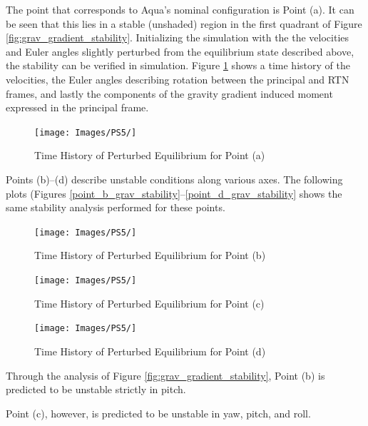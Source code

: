 The point that corresponds to Aqua's nominal configuration is Point (a). It can be seen that this lies in a stable (unshaded) region in the first quadrant of Figure \ref{fig:grav_gradient_stability}. Initializing the simulation with the the velocities and Euler angles slightly perturbed from the equilibrium state described above, the stability can be verified in simulation. Figure \ref{fig:point_a_grav_stability} shows a time history of the velocities, the Euler angles describing rotation between the principal and RTN frames, and lastly the components of the gravity gradient induced moment expressed in the principal frame. 

\begin{figure}[H]
    \centering
    \captionsetup{justification = centering}
    \texttt{[image: Images/PS5/]}
    \caption{Time History of Perturbed Equilibrium for Point (a)}
    \label{fig:point_a_grav_stability}
\end{figure}

Points (b)--(d) describe unstable conditions along various axes. The following plots (Figures \ref{point_b_grav_stability}--\ref{point_d_grav_stability} shows the same stability analysis performed for these points.

\begin{figure}[H]
    \centering
    \captionsetup{justification = centering}
    \texttt{[image: Images/PS5/]}
    \caption{Time History of Perturbed Equilibrium for Point (b)}
    \label{fig:point_b_grav_stability}
\end{figure}

\begin{figure}[H]
    \centering
    \captionsetup{justification = centering}
    \texttt{[image: Images/PS5/]}
    \caption{Time History of Perturbed Equilibrium for Point (c)}
    \label{fig:point_c_grav_stability}
\end{figure}

\begin{figure}[H]
    \centering
    \captionsetup{justification = centering}
    \texttt{[image: Images/PS5/]}
    \caption{Time History of Perturbed Equilibrium for Point (d)}
    \label{fig:point_d_grav_stability}
\end{figure}

Through the analysis of Figure \ref{fig:grav_gradient_stability}, Point (b) is predicted to be unstable strictly in pitch. 

Point (c), however, is predicted to be unstable in yaw, pitch, and roll.

